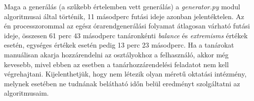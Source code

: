 Maga a generálás (a szűkebb értelemben vett generálás) a \textit{generator.py} modul algoritmusai által történik, 11 másodperc futási ideje azonban jelentéktelen. Az én processzorommal az egész órarendgenerálási folyamat átlagosan várható futási ideje, összesen 61 perc 43 másodperc tanáronkénti \textit{balance} és \textit{extremisms} értékek esetén, egységes értékek esetén pedig 13 perc 23 másodperc. Ha a tanárokat manuálisan akarja hozzárendelni az osztályokhoz a felhasználó, akkor még kevesebb, mivel ebben az esetben a tanárhozzárendelési feladatot nem kell végrehajtani. Kijelenthetjük, hogy nem létezik olyan méretű oktatási intézmény, melynek esetében ne tudnának belátható időn belül eredményt szolgáltatni az algoritmusaim.

